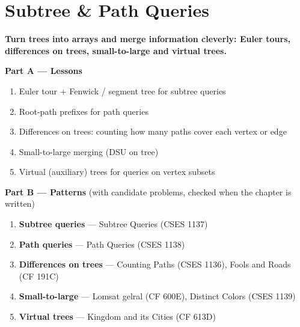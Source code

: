 \chapter{Subtree \& Path Queries}
\label{ch:tree_queries}

\begin{tcolorbox}[enhanced, colback=white, colframe=secondaryblue, boxrule=1pt, arc=2mm]
\textbf{\large\textcolor{primaryblue}{Turn trees into arrays and merge information cleverly: Euler tours, differences on trees, small-to-large and virtual trees.}}
\end{tcolorbox}


\begin{plannedbox}
\textbf{Part A --- Lessons}
\begin{enumerate}[leftmargin=*, label=\textbf{A\arabic*.}, itemsep=1pt]
    \item Euler tour + Fenwick / segment tree for subtree queries
    \item Root-path prefixes for path queries
    \item Differences on trees: counting how many paths cover each vertex or edge
    \item Small-to-large merging (DSU on tree)
    \item Virtual (auxiliary) trees for queries on vertex subsets
\end{enumerate}
\textbf{Part B --- Patterns} (with candidate problems, checked when the chapter is written)
\begin{enumerate}[leftmargin=*, label=\textbf{P\arabic*.}, itemsep=1pt]
    \item \textbf{Subtree queries} --- Subtree Queries {\small\color{darkgray}(CSES 1137)}
    \item \textbf{Path queries} --- Path Queries {\small\color{darkgray}(CSES 1138)}
    \item \textbf{Differences on trees} --- Counting Paths {\small\color{darkgray}(CSES 1136)}, Fools and Roads {\small\color{darkgray}(CF 191C)}
    \item \textbf{Small-to-large} --- Lomsat gelral {\small\color{darkgray}(CF 600E)}, Distinct Colors {\small\color{darkgray}(CSES 1139)}
    \item \textbf{Virtual trees} --- Kingdom and its Cities {\small\color{darkgray}(CF 613D)}
\end{enumerate}
\end{plannedbox}
